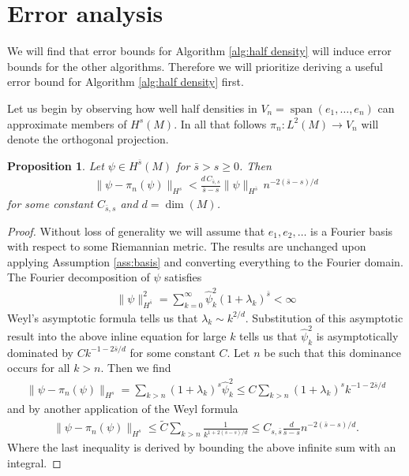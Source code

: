\documentclass[final,leqno]{siamltex1213}
\newtheorem{prop}[thm]{Proposition}
\begin{document}
\section{Error analysis}
We will find that error bounds for Algorithm \ref{alg:half density} will induce error bounds for the other algorithms.
Therefore we will prioritize deriving a useful error bound for Algorithm \ref{alg:half density} first.

Let us begin by observing how well half densities in $V_{n} = \operatorname{span}( e_{1},\dots,e_{n})$ can approximate members of $H^{s}(M)$.
In all that follows $\pi_{n}: L^{2}(M) \to V_{n}$ will denote the orthogonal projection.

\begin{prop} \label{prop:approximation}
	Let $\psi \in H^{\bar{s}}(M)$ for $\bar{s} > s \geq 0$.
	Then
	\begin{align}
		\| \psi - \pi_{n}(\psi) \|_{H^{s}} <  \frac{d \, C_{\bar{s},s} }{ \bar{s}-s} \| \psi \|_{H^{\bar{s}}} \, n^{-2(\bar{s}-s)/d}
	\end{align}
	for some constant $C_{\bar{s},s}$ and $d = \dim(M)$.
\end{prop}
\begin{proof}
	Without loss of generality we will assume that $e_{1},e_{2},\dots$ is a Fourier basis with respect to some Riemannian metric.
	The results are unchanged upon applying Assumption \ref{ass:basis} and converting everything to the Fourier domain.
	The Fourier decomposition of $\psi$ satisfies
	\begin{align}
		\| \psi \|^{2}_{H^{\bar{s} }} = \sum_{k=0}^{\infty} \hat{\psi}_{k}^{2} (1+\lambda_{k})^{\bar{s}} < \infty
	\end{align}
	Weyl's asymptotic formula tells us that $\lambda_{k} \sim k^{2/d}$.
	Substitution of this asymptotic result into the above inline equation for large $k$ tells us that $\hat{\psi}_{k}^{2}$ is asymptotically dominated by  $C k^{-1- 2\bar{s}/d}$
	for some constant $C$.
	Let $n$ be such that this dominance occurs for all $k>n$.  Then we find
	\begin{align}
		\| \psi - \pi_{n}(\psi) \|_{H^{s}} = \sum_{k>n} (1+\lambda_{k})^{s} \hat{\psi}_{k}^{2} \leq C \sum_{k>n} (1+\lambda_{k})^{s} k^{-1- 2\bar{s}/d}
	\end{align}
	and by another application of the Weyl formula
	\begin{align}
		\| \psi - \pi_{n}(\psi) \|_{H^{s}} \leq \tilde{C} \sum_{k>n} \frac{1}{k^{1+2(\bar{s}-s)/d}} \leq C_{s,\bar{s}}  \frac{d }{ \bar{s}-s} n^{-2(\bar{s}-s)/d}.
	\end{align}
	Where the last inequality is derived by bounding the above infinite sum with an integral.
\end{proof}
\end{document}
